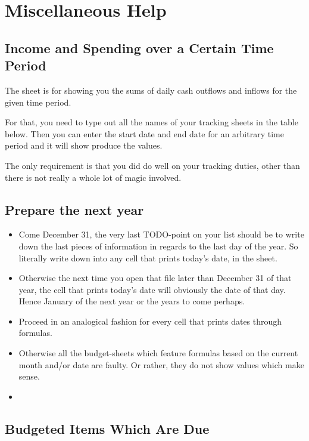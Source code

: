 \section{Miscellaneous Help}
\label{sec:miscellaneous-help}

\subsection{Income and Spending over a Certain Time Period}
\label{subsec:income-and-spending-certain-time-period}

The sheet  is for showing you the sums of daily cash outflows and inflows for the given time period.

For that, you need to type out all the names of your tracking sheets in the table below.
Then you can enter the start date and end date for an arbitrary time period and it will show produce the values.

The only requirement is that you did do well on your tracking duties, other than there is not really a whole lot of magic involved.

\subsection{Prepare the next year}
\label{subsec:prepare-the-next-year}

\begin{itemize}
	\item Come December 31, the very last TODO-point on your list should be to write down the last pieces of information in regards to the last day of the year.
	So literally write down  into any cell that prints today's date, \eg in the  sheet.
	\item Otherwise the next time you open that file later than December 31 of that year, the cell that prints today's date will obviously the date of that day.
	Hence January of the next year or the years to come perhaps.
	\item Proceed in an analogical fashion for every cell that prints dates through formulas.
	\item Otherwise all the budget-sheets which feature formulas based on the current month and/or date are faulty.
	Or rather, they do not show values which make sense.
	\item 
\end{itemize}

\subsection{Budgeted Items Which Are Due}
\label{subsec:budgeted-items-which-are-due}

